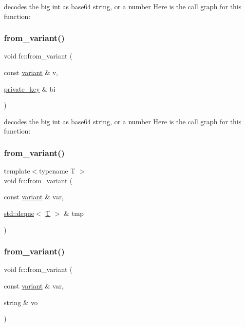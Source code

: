 decodes the big int as base64 string, or a number Here is the call graph for this function\+:
\mbox{\label{namespacefc_a535eb59ca95c338b156a7ede0dea3e98}} 
\subsubsection{\texorpdfstring{from\+\_\+variant()}{from\_variant()}\hspace{0.1cm}{\footnotesize\ttfamily [7/17]}}
{\footnotesize\ttfamily void fc\+::from\+\_\+variant (\begin{DoxyParamCaption}\item[{const \mbox{\hyperlink{classfc_1_1variant}{variant}} \&}]{v,  }\item[{\mbox{\hyperlink{classfc_1_1private__key}{private\+\_\+key}} \&}]{bi }\end{DoxyParamCaption})}

decodes the big int as base64 string, or a number Here is the call graph for this function\+:
\mbox{\label{namespacefc_abaf96fc2899be6615ce66c2863c84490}} 
\subsubsection{\texorpdfstring{from\+\_\+variant()}{from\_variant()}\hspace{0.1cm}{\footnotesize\ttfamily [8/17]}}
{\footnotesize\ttfamily template$<$typename T $>$ \\
void fc\+::from\+\_\+variant (\begin{DoxyParamCaption}\item[{const \mbox{\hyperlink{classfc_1_1variant}{variant}} \&}]{var,  }\item[{\mbox{\hyperlink{classstd_1_1deque}{std\+::deque}}$<$ \mbox{\hyperlink{struct_t}{T}} $>$ \&}]{tmp }\end{DoxyParamCaption})}

\mbox{\label{namespacefc_a2f485ffc3e343bad1a005b535903babb}} 
\subsubsection{\texorpdfstring{from\+\_\+variant()}{from\_variant()}\hspace{0.1cm}{\footnotesize\ttfamily [9/17]}}
{\footnotesize\ttfamily void fc\+::from\+\_\+variant (\begin{DoxyParamCaption}\item[{const \mbox{\hyperlink{classfc_1_1variant}{variant}} \&}]{var,  }\item[{string \&}]{vo }\end{DoxyParamCaption})}


